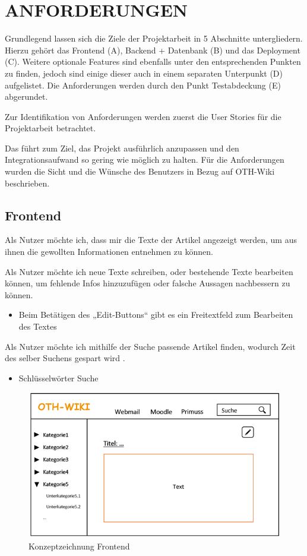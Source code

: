 \documentclass[letterpaper, 10 pt, conference]{ieeeconf}  %
\begin{document}
\section{ANFORDERUNGEN}

Grundlegend lassen sich die Ziele der Projektarbeit in 5 Abschnitte untergliedern. Hierzu gehört das Frontend (A), Backend + Datenbank (B) und das Deployment (C). Weitere optionale Features sind ebenfalls unter den entsprechenden Punkten zu finden, jedoch sind einige dieser auch in einem separaten Unterpunkt (D) aufgelistet. Die Anforderungen werden durch den Punkt Testabdeckung (E) abgerundet.

Zur Identifikation von Anforderungen werden zuerst die User Stories für die Projektarbeit betrachtet.

Das führt zum Ziel, das Projekt ausführlich anzupassen und den Integrationsaufwand so gering wie möglich zu halten. Für die Anforderungen wurden die Sicht und die Wünsche des Benutzers in Bezug auf OTH-Wiki beschrieben. 

\subsection{Frontend} 

Als Nutzer möchte ich, dass mir die Texte der Artikel angezeigt werden, um aus ihnen die gewollten Informationen entnehmen zu können.

Als Nutzer möchte ich neue Texte schreiben, oder bestehende Texte bearbeiten können, um fehlende Infos hinzuzufügen oder falsche Aussagen nachbessern zu können.
\begin{itemize}
\item Beim Betätigen des „Edit-Buttons“ gibt es ein Freitextfeld zum Bearbeiten des Textes
\end{itemize}

Als Nutzer möchte ich mithilfe der Suche passende Artikel finden, wodurch Zeit des selber Suchens gespart wird .
\begin{itemize}
\item Schlüsselwörter Suche
\end{itemize}


\begin{figure}[thpb]
      \centering
      \includegraphics[scale=0.55]{abbildungen/frontend.png}
      \caption{Konzeptzeichnung Frontend}
      \label{fig:frontend}
 \end{figure}
 
\end{document}
